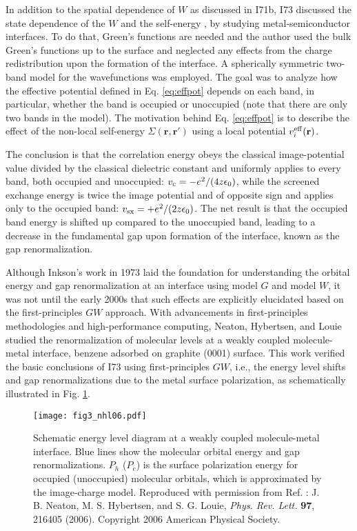 \documentclass[aip, amsmath, amssymb, reprint, longbibliography]{revtex4-2}
\def\mr{\mathbf{r}}
\begin{document}
In addition to the spatial dependence of $W$ as discussed in I71b, I73 discussed the state dependence of the $W$ and the self-energy \cite{I73}, by studying metal-semiconductor interfaces. To do that, Green's functions are needed and the author used the bulk Green's functions up to the surface and neglected any effects from the charge redistribution upon the formation of the interface. A spherically symmetric two-band model \cite{P62} for the wavefunctions was employed. The goal was to analyze how the effective potential defined in Eq. \eqref{eq:effpot} depends on each band, in particular, whether the band is occupied or unoccupied (note that there are only two bands in the model). The motivation behind Eq. \eqref{eq:effpot} is to describe the effect of the non-local self-energy $\Sigma(\mr,\mr')$ using a local potential $v^{\rm eff}_i(\mr)$.

The conclusion is that the correlation energy obeys the classical image-potential value divided by the classical dielectric constant and uniformly applies to every band, both occupied and unoccupied: $v_{\rm c}=-e^2/(4z\epsilon_0)$, while the screened exchange energy is twice the image potential and of opposite sign and applies only to the occupied band: $v_{\rm sx}=+e^2/(2z\epsilon_0)$. The net result is that the occupied band energy is shifted up compared to the unoccupied band, leading to a decrease in the fundamental gap upon formation of the interface, known as the gap renormalization.

Although Inkson's work in 1973 laid the foundation for understanding the orbital energy and gap renormalization at an interface using model $G$ and model $W$, it was not until the early 2000s that such effects are explicitly elucidated based on the first-principles $GW$ approach. With advancements in first-principles methodologies and high-performance computing, Neaton, Hybertsen, and Louie \cite{NHL06} studied the renormalization of molecular levels at a weakly coupled molecule-metal interface, benzene adsorbed on graphite (0001) surface. This work verified the basic conclusions of I73 using first-principles $GW$, i.e., the energy level shifts and gap renormalizations due to the metal surface polarization, as schematically illustrated in Fig. \ref{fig:nhl06}.

\begin{figure}[htp]
\centering
\texttt{[image: fig3\_nhl06.pdf]}
\caption{Schematic energy level diagram at a weakly coupled molecule-metal interface. Blue lines show the molecular orbital energy and gap renormalizations. $P_h$ ($P_e$) is the surface polarization energy for occupied (unoccupied) molecular orbitals, which is approximated by the image-charge model. Reproduced with
permission from Ref. : J. B. Neaton, M. S. Hybertsen, and S. G. Louie, \emph{Phys. Rev. Lett.} \textbf{97}, 216405 (2006). Copyright 2006 American Physical Society.}
\label{fig:nhl06}
\end{figure}
\end{document}
